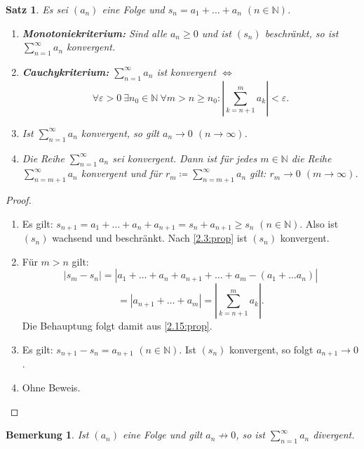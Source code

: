 \documentclass[12pt]{extreport} %
\newcommand{\N}{\mathbb{N}}
\theoremstyle{named}
\theoremstyle{itshape}
\newtheorem{satz}[unnamedtheorem]{Satz}
\theoremstyle{normal}
\newtheorem*{bemerkung}{Bemerkung}
\begin{document}
 
\begin{satz} \label{3.1:satz} 
	Es sei $(a_{n})$ eine Folge und $s_{n} = a_{1} + \dotsc + a_{n}$ $(n \in \N)$.
	\begin{enumerate}
		\item \textbf{Monotoniekriterium:} Sind alle $a_{n} \geq 0$ und ist $(s_{n})$ beschränkt, so ist $\sum_{n = 1}^{\infty} a_{n}$ konvergent.
		\item \textbf{Cauchykriterium:} $\sum_{n = 1}^{\infty} a_{n}$ ist konvergent $\iff$
			$$\forall \varepsilon > 0 ~ \exists n_{0} \in \N ~ \forall m > n \geq n_{0}: \left| \sum_{k = n+1}^{m} a_{k} \right| < \varepsilon. $$ \label{3.1.b:satz} 
		\item Ist $\sum_{n=1}^{\infty} a_{n}$ konvergent, so gilt $a_{n} \rightarrow 0$ $(n \to \infty)$. \label{3.1.c:satz} 
		\item Die Reihe $\sum_{n=1}^{\infty} a_{n}$ sei konvergent. Dann ist für jedes $m \in \N$ die Reihe $\sum_{n=m+1}^{\infty} a_{n}$ konvergent und für 
		      $r_{m} \coloneqq \sum_{n = m+1}^{\infty} a_{n}$ gilt: $r_{m} \rightarrow 0$ $(m \to \infty)$.
	\end{enumerate}
\end{satz}

\begin{proof} ~\
	\begin{enumerate}
		\item Es gilt: $s_{n+1} = a_{1} + \dotsc + a_{n} + a_{n+1} = s_{n} + a_{n+1} \geq s_{n}$ $(n \in \N)$. Also ist $(s_{n})$ wachsend und beschränkt.
		 Nach \ref{2.3:prop} ist $(s_{n})$ konvergent.
		\item Für $m > n$ gilt: 
		$$
		|s_{m} - s_{n}| = | a_{1} + \dotsc + a_{n} + a_{n+1} + \dotsc + a_{m} - (a_{1} + \dotsc a_{n})| 
		$$
		$$
		= |a_{n+1} + \dotsc + a_{m}| = |\sum_{k=n+1}^{m} a_{k}|.
		$$
		Die Behauptung folgt damit aus \ref{2.15:prop}.
		\item Es gilt: $s_{n+1} - s_{n} = a_{n+1}$ $(n \in \N)$. Ist $(s_{n})$ konvergent, so folgt $a_{n+1} \rightarrow 0$.
		\item Ohne Beweis.
	\end{enumerate}	
\end{proof}


\begin{bemerkung}
	Ist $(a_{n})$ eine Folge und gilt $a_{n} \not\rightarrow 0$, so ist $\sum_{n=1}^{\infty} a_{n}$ divergent.
\end{bemerkung}
\end{document}
